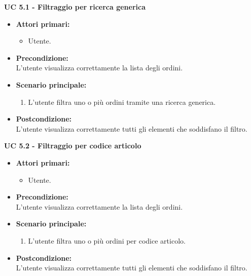 \noindent \textbf{\large UC 5.1 - Filtraggio per ricerca generica}
\label{uc:filtraggio-ricerca-generica}
\begin{itemize}

	\item \textbf{Attori primari: }
		\begin{itemize}
			\item Utente.
		\end{itemize}

	\item \textbf{Precondizione: }\\[0.3cm]
		L'utente visualizza correttamente la lista degli ordini.

	\item \textbf{Scenario principale: }
		\begin{enumerate}
			\item L'utente filtra uno o più ordini tramite una ricerca generica.
		\end{enumerate}
		

	\item \textbf{Postcondizione: }\\[0.3cm]
		L'utente visualizza correttamente tutti gli elementi che soddisfano il filtro.

\end{itemize}

\vspace{0.5cm}

\noindent \textbf{\large UC 5.2 - Filtraggio per codice articolo}
\label{uc:filtraggio-codice-articolo}
\begin{itemize}

	\item \textbf{Attori primari: }
		\begin{itemize}
			\item Utente.
		\end{itemize}

	\item \textbf{Precondizione: }\\[0.3cm]
		L'utente visualizza correttamente la lista degli ordini.

	\item \textbf{Scenario principale: }
		\begin{enumerate}
			\item L'utente filtra uno o più ordini per codice articolo.
		\end{enumerate}
		

	\item \textbf{Postcondizione: }\\[0.3cm]
		L'utente visualizza correttamente tutti gli elementi che soddisfano il filtro.

\end{itemize}

